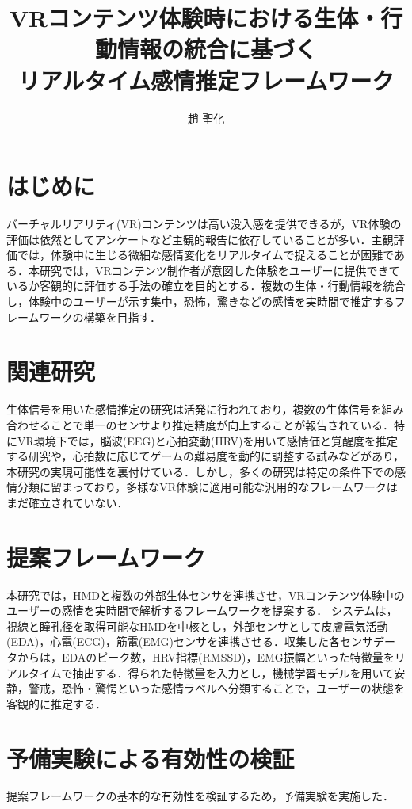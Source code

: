 \documentclass[paper=a4paper,fontsize=10pt,jafontscale=0.925,twocolumn]{jlreq}
\title{VRコンテンツ体験時における生体・行動情報の統合に基づく\\リアルタイム感情推定フレームワーク} %
\affiliation{人間システム工学科 井村研究室} %
\author{趙 聖化} %
\begin{document}
\maketitle

\section{はじめに}
バーチャルリアリティ(VR)コンテンツは高い没入感を提供できるが，VR体験の評価は依然としてアンケートなど主観的報告に依存していることが多い．主観評価では，体験中に生じる微細な感情変化をリアルタイムで捉えることが困難である．本研究では，VRコンテンツ制作者が意図した体験をユーザーに提供できているか客観的に評価する手法の確立を目的とする．複数の生体・行動情報を統合し，体験中のユーザーが示す集中，恐怖，驚きなどの感情を実時間で推定するフレームワークの構築を目指す．

\section{関連研究}
生体信号を用いた感情推定の研究は活発に行われており，複数の生体信号を組み合わせることで単一のセンサより推定精度が向上することが報告されている\cite{Guixeres2020}．特にVR環境下では，脳波(EEG)と心拍変動(HRV)を用いて感情価と覚醒度を推定する研究\cite{Marin-Morales2018}や，心拍数に応じてゲームの難易度を動的に調整する試み\cite{Orozco-Mora2024}などがあり，本研究の実現可能性を裏付けている．しかし，多くの研究は特定の条件下での感情分類に留まっており，多様なVR体験に適用可能な汎用的なフレームワークはまだ確立されていない．

\section{提案フレームワーク}
本研究では，HMDと複数の外部生体センサを連携させ，VRコンテンツ体験中のユーザーの感情を実時間で解析するフレームワークを提案する．
システムは，視線と瞳孔径を取得可能なHMDを中核とし，外部センサとして皮膚電気活動(EDA)，心電(ECG)，筋電(EMG)センサを連携させる．収集した各センサデータからは，EDAのピーク数，HRV指標(RMSSD)，EMG振幅といった特徴量をリアルタイムで抽出する．得られた特徴量を入力とし，機械学習モデルを用いて安静，警戒，恐怖・驚愕といった感情ラベルへ分類することで，ユーザーの状態を客観的に推定する．

\section{予備実験による有効性の検証}
提案フレームワークの基本的な有効性を検証するため，予備実験を実施した．
\end{document}
